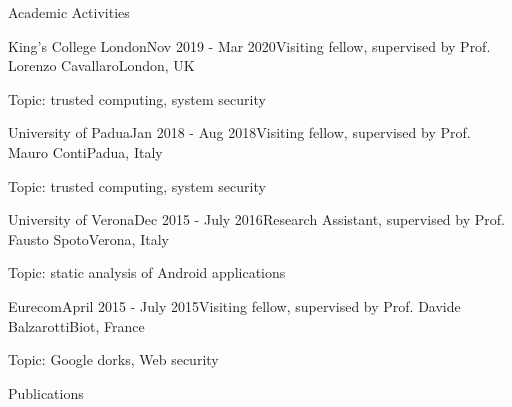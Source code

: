 \documentclass{resume} %
\begin{document}

\begin{rSection}{Academic Activities}

\begin{rSubsection}{King's College London}{Nov 2019 - Mar 2020}{Visiting 
fellow, supervised by Prof. Lorenzo Cavallaro}{London, UK}
	\item Topic: trusted computing, system security
\end{rSubsection}

\begin{rSubsection}{University of Padua}{Jan 2018 - Aug 2018}{Visiting fellow, supervised by Prof. Mauro Conti}{Padua, Italy}
    \item Topic: trusted computing, system security
\end{rSubsection}


\begin{rSubsection}{University of Verona}{Dec 2015 - July 2016}{Research Assistant, supervised by Prof. Fausto Spoto}{Verona, Italy}
\item Topic: static analysis of Android applications
\end{rSubsection}

\begin{rSubsection}{Eurecom}{April 2015 - July 2015}{Visiting fellow, supervised by Prof. Davide Balzarotti}{Biot, France}
\item Topic: Google dorks, Web security
\end{rSubsection}

\end{rSection}
\newpage
\begin{rSection}{Publications}





    
\end{rSection}
\end{document}
